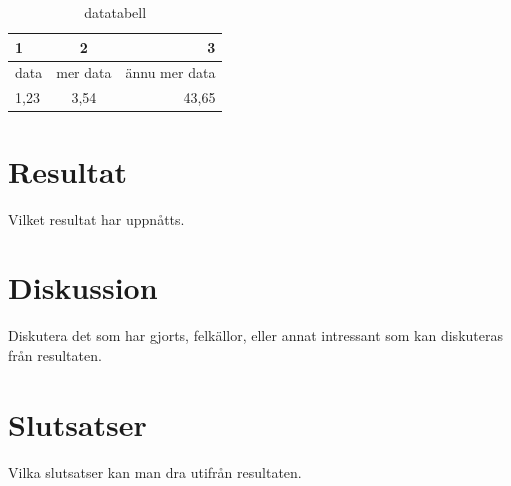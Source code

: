 \documentclass[12pt, a4paper]{article}
\begin{document}
\begin{table}[H]
	\centering
	\caption{datatabell}
	\label{tab:tabelldata}
	\begin{tabular}{|l|c|r|}
\hline
\textbf{1} & \textbf{2} &  \textbf{3} \\
\hline
\hline
data & mer data & ännu mer data \\
\hline
1,23 & 3,54 & 43,65 \\
\hline 
	\end{tabular}
\end{table}

\section{Resultat}

Vilket resultat har uppnåtts.

\section{Diskussion}

Diskutera det som har gjorts, felkällor, eller annat intressant som kan diskuteras från resultaten.

\section{Slutsatser}

Vilka slutsatser kan man dra utifrån resultaten.

\newpage
\printbibliography
\end{document}
